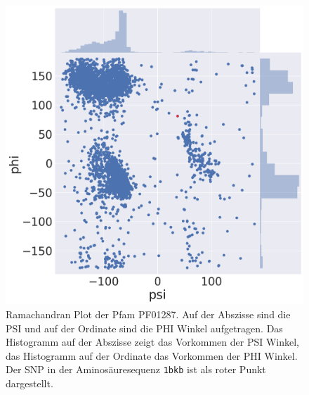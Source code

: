 \begin{figure}[H]
    \centering
    \includegraphics[width=.90\textwidth]{images/ramachandranplot_PF01287.png}
    \caption{Ramachandran Plot der Pfam PF01287. Auf der Abszisse sind die PSI und auf der Ordinate sind die PHI Winkel aufgetragen. Das Histogramm auf der Abszisse zeigt das Vorkommen der PSI Winkel, das Histogramm auf der Ordinate das Vorkommen der PHI Winkel. Der \ac{SNP} in der Aminosäuresequenz \texttt{1bkb} ist als roter Punkt dargestellt.}
    \label{fig:ramachandran_PF01287}
\end{figure}
